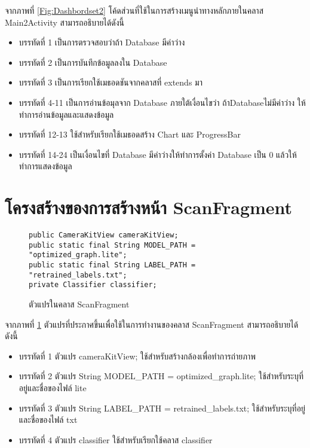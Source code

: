 	\newpage
	จากภาพที่ \ref{Fig:Dashbordset2} โค้ดส่วนที่ใช้ในการสร้างเมนูนำทางหลักภายในคลาส Main2Activity สามารถอธิบายได้ดังนี้
	\begin{itemize}[label={--}]
		\item บรรทัดที่ 1  เป็นการตรวจสอบว่าถ้า Database มีค่าว่าง
		\item บรรทัดที่ 2  เป็นการบันทึกข้อมูลลงใน Database 
		\item บรรทัดที่ 3  เป็นการเรียกใช้เมธอดชันจากคลาสที่ extends มา
		\item บรรทัดที่ 4-11 เป็นการอ่านข้อมุลจาก Database ภายใต้เงื่อนไขว่า ถ้าDatabaseไม่มีค่าว่าง ให้ทำการอ่านข้อมูลและแสดงข้อมูล
		\item บรรทัดที่ 12-13  ใช้สำหรับเรียกใช้เมธอดสร้าง Chart และ ProgressBar 
		\item บรรทัดที่ 14-24 เป็นเงื่อนไขที่ Database มีค่าว่างให้ทำการตั้งค่า Database เป็น 0 แล้วให้ทำการแสดงข้อมูล
	\end{itemize}



	\section{โครงสร้างของการสร้างหน้า ScanFragment}
	\begin{figure}[H]
		{\begin{lstlisting}
public CameraKitView cameraKitView;
public static final String MODEL_PATH = "optimized_graph.lite";
public static final String LABEL_PATH = "retrained_labels.txt";
private Classifier classifier;
			\end{lstlisting}}
		\caption{ตัวแปรในคลาส ScanFragment}
		\label{Fig:ScanFragment}
	\end{figure}
	จากภาพที่ \ref{Fig:ScanFragment} ตัวแปรที่ประกาศขึ้นเพื่อใช้ในการทำงานของคลาส ScanFragment สามารถอธิบายได้ดังนี้
	\begin{itemize}[label={--}]
		\item บรรทัดที่ 1 ตัวแปร cameraKitView; ใช้สำหรับสร้างกล้องเพื่อทำการถ่ายภาพ
		\item บรรทัดที่ 2 ตัวแปร String MODEL\_PATH = optimized\_graph.lite;  ใช้สำหรับระบุที่อยู่และชื่อของไฟล์ lite
		\item บรรทัดที่ 3 ตัวแปร String LABEL\_PATH = retrained\_labels.txt;  ใช้สำหรับระบุที่อยู่และชื่อของไฟล์ txt
		\item บรรทัดที่ 4 ตัวแปร classifier ใช้สำหรับเรียกใช้คลาส classifier
	\end{itemize}

